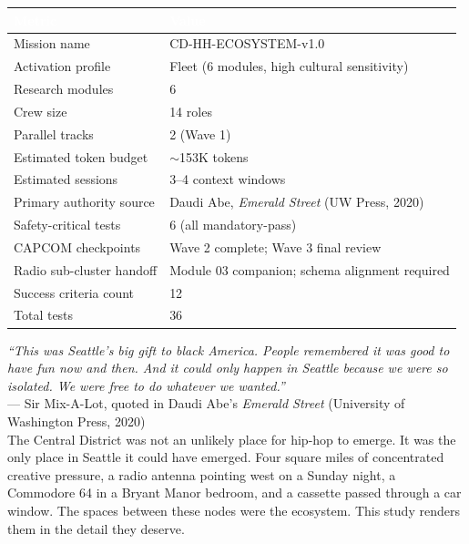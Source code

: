 \documentclass[11pt,letterpaper]{article}
\newcommand{\tableheader}[1]{\textbf{\sffamily\textcolor{white}{#1}}}
\begin{document}
\begin{center}
\begin{tabularx}{\textwidth}{L{4cm}X}
\toprule
{}
\tableheader{Metric} & \tableheader{Value} \\
\midrule
Mission name & CD-HH-ECOSYSTEM-v1.0 \\
Activation profile & Fleet (6 modules, high cultural sensitivity) \\
Research modules & 6 \\
Crew size & 14 roles \\
Parallel tracks & 2 (Wave 1) \\
Estimated token budget & $\sim$153K tokens \\
Estimated sessions & 3--4 context windows \\
Primary authority source & Daudi Abe, \textit{Emerald Street} (UW Press, 2020) \\
Safety-critical tests & 6 (all mandatory-pass) \\
CAPCOM checkpoints & Wave 2 complete; Wave 3 final review \\
Radio sub-cluster handoff & Module 03 companion; schema alignment required \\
Success criteria count & 12 \\
Total tests & 36 \\
\bottomrule
\end{tabularx}
\end{center}

\vspace{2em}

\begin{quotebox}
\textit{``This was Seattle's big gift to black America. People remembered it was good to have fun now and then. And it could only happen in Seattle because we were so isolated. We were free to do whatever we wanted.''}\\[0.5em]
\hfill --- Sir Mix-A-Lot, quoted in Daudi Abe's \textit{Emerald Street} (University of Washington Press, 2020)\\[1em]
The Central District was not an unlikely place for hip-hop to emerge. It was the only place in Seattle it could have emerged. Four square miles of concentrated creative pressure, a radio antenna pointing west on a Sunday night, a Commodore 64 in a Bryant Manor bedroom, and a cassette passed through a car window. The spaces between these nodes were the ecosystem. This study renders them in the detail they deserve.
\end{quotebox}
\end{document}
